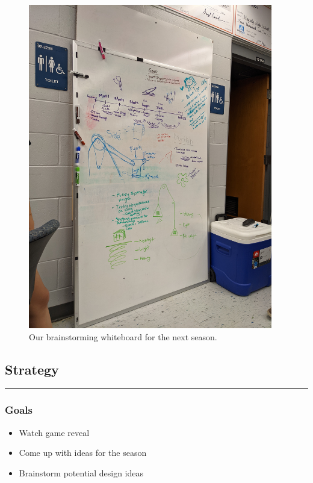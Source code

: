\begin{figure}[ht]
\begin{minipage}[b]{.48\textwidth}
  \includegraphics[width=0.95\textwidth]{Meetings/September/09-18-21/PXL_20210918_184637754 - Jensen Miller.jpg}
  \caption{Our brainstorming whiteboard for the next season.}
  \label{fig:pic2}
\end{minipage}
\end{figure}

\subsection*{Strategy}
\noindent\hfil\rule{\textwidth}{.4pt}\hfil
\subsubsection*{Goals}
\begin{itemize}
    \item Watch game reveal
		\item Come up with ideas for the season
		\item Brainstorm potential design ideas

\end{itemize} 


